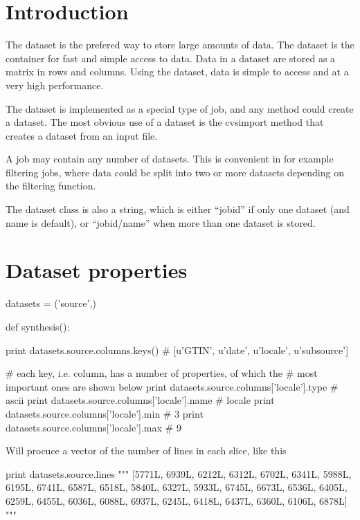 \section{Introduction}
The dataset is the prefered way to store large amounts of data.  The
dataset is the container for fast and simple access to data.  Data in
a dataset are stored as a matrix in rows and columns.  Using the
dataset, data is simple to access and at a very high performance.

The dataset is implemented as a special type of job, and any method
could create a dataset.  The most obvious use of a dataset is the
cvsimport method that creates a dataset from an input file.

A job may contain any number of datasets.  This is convenient in for
example filtering jobs, where data could be split into two or more
datasets depending on the filtering function.

The dataset class is also a string, which is either ``jobid'' if only
one dataset (and name is default), or ``jobid/name'' when more than
one dataset is stored.







\section{Dataset properties}


\begin{python}
datasets = ('source',)

def synthesis():
\end{python}

\begin{python}
  print datasets.source.columns.keys()
  # [u'GTIN', u'date', u'locale', u'subsource']

  # each key, i.e. column, has a number of properties, of which the
  # most important ones are shown below
  print datasets.source.columns['locale'].type
  # ascii
  print datasets.source.columns['locale'].name
  # locale
  print datasets.source.columns['locale'].min
  # 3
  print datasets.source.columns['locale'].max
  # 9
  
\end{python}

Will procuce a vector of the number of lines in each slice, like this

\begin{python}
  print datasets.source.lines
  """
[5771L, 6939L, 6212L, 6312L, 6702L, 6341L, 5988L, 6195L,
 6741L, 6587L, 6518L, 5840L, 6327L, 5933L, 6745L, 6673L,
 6536L, 6405L, 6259L, 6455L, 6036L, 6088L, 6937L, 6245L,
 6418L, 6437L, 6360L, 6106L, 6878L]
"""
\end{python}


